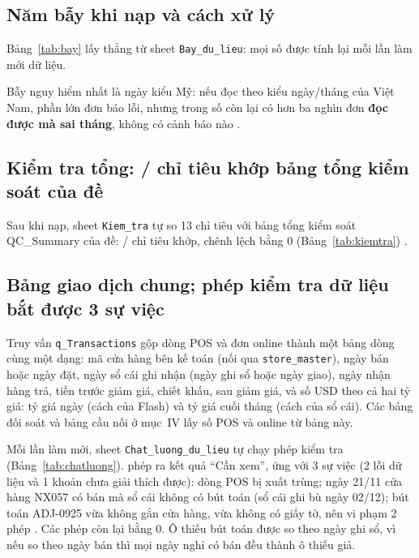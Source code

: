 \subsection{Năm bẫy khi nạp và cách xử lý}

Bảng~\ref{tab:bay} lấy thẳng từ sheet \texttt{Bay\_du\_lieu}: mọi số được tính lại mỗi lần làm mới dữ liệu.

\label{tab:bay}\nopagebreak[4]


Bẫy nguy hiểm nhất là ngày kiểu Mỹ: nếu đọc theo kiểu ngày/tháng của Việt Nam, phần lớn đơn báo lỗi, nhưng trong số còn lại có hơn ba nghìn đơn \textbf{đọc được mà sai tháng}, không có cảnh báo nào .

\subsection{Kiểm tra tổng: \SoQCDat/\SoQCTong{} chỉ tiêu khớp bảng tổng kiểm soát của đề}

Sau khi nạp, sheet \texttt{Kiem\_tra} tự so 13 chỉ tiêu với bảng tổng kiểm soát QC\_Summary của đề: \SoQCDat/\SoQCTong{} chỉ tiêu khớp, chênh lệch bằng 0 (Bảng~\ref{tab:kiemtra}) .

\label{tab:kiemtra}\nopagebreak[4]
{\small}

\subsection{Bảng giao dịch chung; \SoKiemTraChatLuong{} phép kiểm tra dữ liệu bắt được 3 sự việc}

Truy vấn \texttt{q\_Transactions} gộp \SoDongPOS{} dòng POS và \SoDongWEB{} đơn online thành một bảng \SoDongGiaoDich{} dòng cùng một dạng: mã cửa hàng bên kế toán (nối qua \texttt{store\_master}), ngày bán hoặc ngày đặt, ngày sổ cái ghi nhận (ngày ghi sổ hoặc ngày giao), ngày nhận hàng trả, tiền trước giảm giá, chiết khấu, sau giảm giá, và số USD theo cả hai tỷ giá: tỷ giá ngày (cách của Flash) và tỷ giá cuối tháng (cách của sổ cái). Các bảng đối soát và bảng cầu nối ở mục~IV lấy số POS và online từ bảng này.

Mỗi lần làm mới, sheet \texttt{Chat\_luong\_du\_lieu} tự chạy \SoKiemTraChatLuong{} phép kiểm tra (Bảng~\ref{tab:chatluong}). \SoKiemTraCanXem{} phép ra kết quả ``Cần xem'', ứng với 3 sự việc (2 lỗi dữ liệu và 1 khoản chưa giải thích được): dòng POS bị xuất trùng; ngày 21/11 cửa hàng NX057 có bán mà sổ cái không có bút toán (sổ cái ghi bù ngày 02/12); bút toán ADJ-0925 vừa không gắn cửa hàng, vừa không có giấy tờ, nên vi phạm 2 phép . Các phép còn lại bằng 0. Ô thiếu bút toán được so theo ngày ghi sổ, vì nếu so theo ngày bán thì mọi ngày nghỉ có bán đều thành ô thiếu giả.

